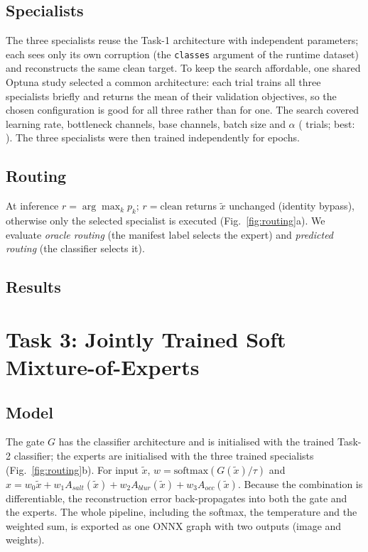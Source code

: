 \documentclass[conference]{IEEEtran}
\begin{document}
\subsection{Specialists}
The three specialists reuse the Task-1 architecture with independent parameters; each sees only its own corruption (the \texttt{classes} argument of the runtime dataset) and reconstructs the same clean target. To keep the search affordable, one shared Optuna study selected a common architecture: each trial trains all three specialists briefly and returns the mean of their validation objectives, so the chosen configuration is good for all three rather than for one. The search covered learning rate, bottleneck channels, base channels, batch size and $\alpha$ (\SPTRIALS{} trials; best: \SPBESTPARAMS). The three specialists were then trained independently for \SPEPOCHS{} epochs.

\subsection{Routing}
At inference $r=\arg\max_k p_k$; $r=\text{clean}$ returns $\tilde{x}$ unchanged (identity bypass), otherwise only the selected specialist is executed (Fig.~\ref{fig:routing}a). We evaluate \emph{oracle routing} (the manifest label selects the expert) and \emph{predicted routing} (the classifier selects it).

\subsection{Results}


\section{Task 3: Jointly Trained Soft Mixture-of-Experts}
\subsection{Model}
The gate $G$ has the classifier architecture and is initialised with the trained Task-2 classifier; the experts are initialised with the three trained specialists (Fig.~\ref{fig:routing}b). For input $\tilde{x}$,
$w=\text{softmax}(G(\tilde{x})/\tau)$ and $\hat{x}=w_0\tilde{x}+w_1A_{salt}(\tilde{x})+w_2A_{blur}(\tilde{x})+w_3A_{occ}(\tilde{x})$. Because the combination is differentiable, the reconstruction error back-propagates into both the gate and the experts. The whole pipeline, including the softmax, the temperature and the weighted sum, is exported as one ONNX graph with two outputs (image and weights).
\end{document}
